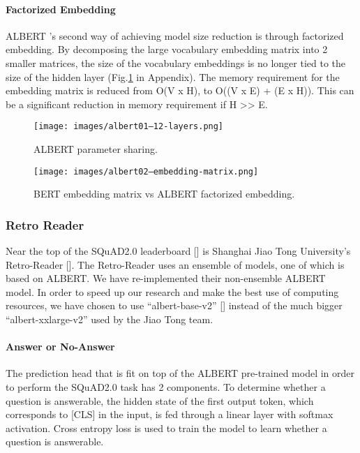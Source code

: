 \documentclass{article}
\begin{document}
\paragraph{Factorized Embedding}
ALBERT ’s second way of achieving model size reduction is through factorized embedding.  By decomposing the large vocabulary embedding matrix into 2 smaller matrices, the size of the vocabulary embeddings is no longer tied to the size of the hidden layer (Fig.\ref{fig:albert02EmbeddingMatrix} in Appendix).  The memory requirement for the embedding matrix is reduced from O(V x H), to O((V x E) + (E x H)).  This can be a significant reduction in memory requirement if H >> E.



\begin{figure}[h]
    \centering
    \begin{minipage}{0.45\textwidth}
        \centering
        \texttt{[image: images/albert01--12-layers.png]}
        \caption{ALBERT parameter sharing.}
        \label{fig:albert01Layers}
    \end{minipage}\hfill
    \begin{minipage}{0.45\textwidth}
        \centering
        \texttt{[image: images/albert02--embedding-matrix.png]}
        \caption{BERT embedding matrix vs ALBERT factorized embedding.}
        \label{fig:albert02EmbeddingMatrix}
    \end{minipage}
\end{figure}



\subsubsection{Retro Reader}
Near the top of the SQuAD2.0 leaderboard [] is Shanghai Jiao Tong University’s Retro-Reader [].  The Retro-Reader uses an ensemble of models, one of which is based on ALBERT.  We have re-implemented their non-ensemble ALBERT model.  In order to speed up our research and make the best use of computing resources, we have chosen to use “albert-base-v2” [] instead of the much bigger “albert-xxlarge-v2” used by the Jiao Tong team.

\paragraph{Answer or No-Answer}
The prediction head that is fit on top of the ALBERT pre-trained model in order to perform the SQuAD2.0 task has 2 components.  To determine whether a question is answerable, the hidden state of the first output token, which corresponds to [CLS] in the input, is fed through a linear layer with softmax activation.  Cross entropy loss is used to train the model to learn whether a question is answerable.
\end{document}

